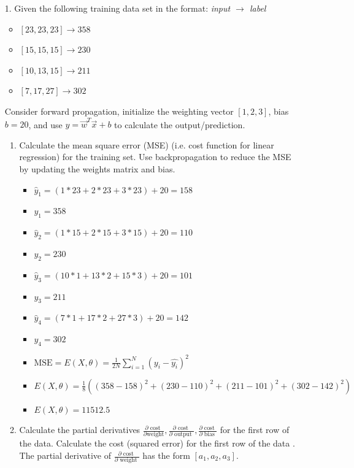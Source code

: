 \documentclass[main.tex]{subfiles}
\begin{document}
\begin{enumerate}

\item[1.] Given the following training data set in the format: \textit{input $\rightarrow$ label}
\begin{itemize}[label={}]
    \item $[23,23,23] \rightarrow 358$
    \item $[15,15,15] \rightarrow 230$
    \item $[10,13,15] \rightarrow 211$
    \item $[7,17,27] \rightarrow 302$
\end{itemize}
Consider forward propagation, initialize the weighting vector $[1,2,3]$, bias $b=20$, and use $y=\vec{w}^{T}\vec{x}+b$ to calculate the output/prediction.
    \begin{enumerate}
        \item Calculate the mean square error (MSE) (i.e. cost function for linear regression) for the training set. Use backpropagation to reduce the MSE by updating the weights matrix and bias.
        
        \begin{itemize}[label={}]
            \item $\hat{y}_1 = \left(1*23+2*23+3*23\right)+20= 158$
            \item ${y}_1 = 358$
            \item $\hat{y}_2 = \left(1*15+2*15+3*15\right)+20= 110$
            \item ${y}_2 = 230$
            \item $\hat{y}_3 = \left(10*1+13*2+15*3\right)+20= 101$
            \item ${y}_3 = 211$
            \item $\hat{y}_4 = \left(7*1+17*2+27*3\right)+20= 142$
            \item ${y}_4 = 302$
            \item $\text{MSE} = E(X,\theta) = \frac{1}{2N}\sum_{i=1}^{N}\left(y_i-\hat{y_i}\right)^2$
            \item $E(X,\theta) = \frac{1}{8}\left(\left (358-158\right)^2+\left(230-110\right)^2+\left(211-101\right)^2+\left(302-142\right)^2\right)$
            \item $E(X,\theta) = 11512.5$
        \end{itemize}
        
        \item Calculate the partial derivatives $\frac{\partial \text { cost }}{\partial \text{weight}}, \frac{\partial \text { cost }}{\partial \text { output }}, \frac{\partial \text { cost }}{\partial \text { bias }}$ for the first row of the data. Calculate the cost (squared error) for the first row of the data . The partial derivative of $\frac{\partial \text { cost }}{\partial \text { weight }}$ has the form $[a_1,a_2,a_3]$. \\


\end{enumerate}
\end{enumerate}
\end{document}
